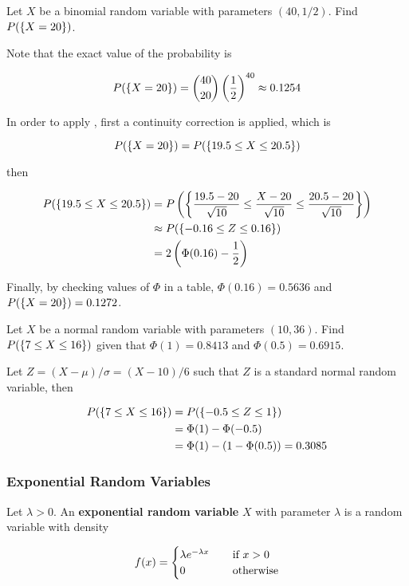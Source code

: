 \documentclass[a4paper,12pt]{article}
\begin{document}
\begin{exm}
  Let $X$ be a binomial random variable with parameters $(40,1/2)$. Find $P(\left\{ X=20\right\})$.\n

  \ans Note that the exact value of the probability is

  $$P(\left\{ X=20\right\})=\binom{40}{20}\left( \frac{1}{2}\right)^{40}\approx 0.1254$$\s

  In order to apply \rthm[\sctr{1}], first a continuity correction is applied, which is

  $$P(\left\{ X=20\right\})=P(\left\{ 19.5\leq X\leq 20.5\right\})$$\s

  then

  $$\begin{aligned}[t]
    P(\left\{ 19.5\leq X\leq 20.5\right\})&=P\left( \left\{ \frac{19.5-20}{\sqrt{10}}\leq\frac{X-20}{\sqrt{10}}\leq\frac{20.5-20}{\sqrt{10}}\right\}\right)\\
    &\approx P(\left\{ -0.16\leq Z\leq 0.16\right\})\\
    &=2\left( \Phi(0.16)-\frac{1}{2}\right)
  \end{aligned}$$\s

  Finally, by checking values of $\Phi$ in a table, $\Phi(0.16)=0.5636$ and $P(\left\{ X=20\right\})=0.1272$.
\end{exm}

\begin{exm}
  Let $X$ be a normal random variable with parameters $(10,36)$. Find $P(\left\{ 7\leq X\leq 16\right\})$ given that $\Phi(1)=0.8413$ and $\Phi(0.5)=0.6915$.\n

  \ans Let $Z=(X-\mu)/\sigma=(X-10)/6$ such that $Z$ is a standard normal random variable, then

  $$\begin{aligned}[t]
    P(\left\{ 7\leq X\leq 16\right\})&=P(\left\{ -0.5\leq Z\leq 1\right\})\\
    &=\Phi(1)-\Phi(-0.5)\\
    &=\Phi(1)-(1-\Phi(0.5))=0.3085
  \end{aligned}$$
\end{exm}

\subsubsection{Exponential Random Variables}
\begin{dft}
  Let $\lambda>0$. An \textbf{exponential random variable} $X$ with parameter $\lambda$ is a random variable with density

  $$f(x)=\begin{cases}
    \lambda e^{-\lambda x}&\;\;\;\;\text{if }x>0\\
    0&\;\;\;\;\text{otherwise}
  \end{cases}$$
\end{dft}\n
\end{document}
